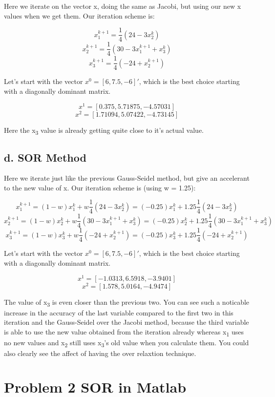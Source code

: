\documentclass[]{article}
\begin{document}
Here we iterate on the vector x, doing the same as Jacobi, but using our
new x values when we get them. Our iteration scheme is:

\[x_1^{k+1} = \frac1{4}(24-3x_2^k)\]
\[x_2^{k+1}= \frac1{4}(30-3x_1^{k+1}+x_3^k)\]
\[x_3^{k+1}=\frac1{4}(-24+x_2^{k+1})\]

Let's start with the vector \(x^0=[6, 7.5, -6]'\), which is the best
choice starting with a diagonally dominant matrix.

\[x^1=[0.375, 5.71875, -4.57031]\] \[x^2=[1.71094, 5.07422, -4.73145]\]

Here the x\textsubscript{3} value is already getting quite close to it's
actual value.

\hypertarget{d.-sor-method}{%
\subsection{d. SOR Method}\label{d.-sor-method}}

Here we iterate just like the previous Gauss-Seidel method, but give an
accelerant to the new value of x. Our iteration scheme is (using w =
1.25):

\[x_1^{k+1} =(1-w)x_1^k+ w\frac1{4}(24-3x_2^k) = (-0.25)x_1^k+ 1.25\frac1{4}(24-3x_2^k)\]
\[x_2^{k+1}= (1-w)x_2^k+ w\frac1{4}(30-3x_1^{k+1}+x_3^k)=(-0.25)x_2^k+ 1.25\frac1{4}(30-3x_1^{k+1}+x_3^k)\]
\[x_3^{k+1}=(1-w)x_3^k+ w\frac1{4}(-24+x_2^{k+1})=(-0.25)x_3^k+ 1.25\frac1{4}(-24+x_2^{k+1})\]

Let's start with the vector \(x^0=[6, 7.5, -6]'\), which is the best
choice starting with a diagonally dominant matrix.

\[x^1 = [-1.0313, 6.5918, -3.9401]\] \[x^2 = [1.578, 5.0164, -4.9474]\]

The value of x\textsubscript{3} is even closer than the previous two.
You can see such a noticable increase in the accuracy of the last
variable compared to the first two in this iteration and the
Gauss-Seidel over the Jacobi method, because the third variable is able
to use the new value obtained from the iteration already whereas
x\textsubscript{1} uses no new values and x\textsubscript{2} still uses
x\textsubscript{3}'s old value when you calculate them. You could also
clearly see the affect of having the over relaxtion technique.

\hypertarget{problem-2-sor-in-matlab}{%
\section{Problem 2 SOR in Matlab}\label{problem-2-sor-in-matlab}}
\end{document}
